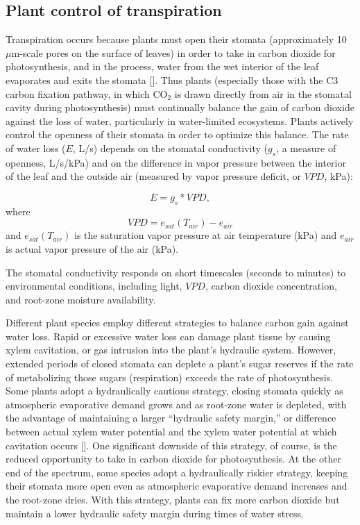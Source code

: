 \subsection{Plant control of transpiration}

Transpiration occurs because plants must open their stomata (approximately 10 $\mu$m-scale pores on the surface of leaves) in order to take in carbon dioxide for photosynthesis, and in the process, water from the wet interior of the leaf evaporates and exits the stomata [\cite{bonan}].  Thus plants (especially those with the C3 carbon fixation pathway, in which CO$_2$ is drawn directly from air in the stomatal cavity during photosynthesis) must continually balance the gain of carbon dioxide against the loss of water, particularly in water-limited ecosystems.  Plants actively control the openness of their stomata in order to optimize this balance.  The rate of water loss ($E$, L/s) depends on the stomatal conductivity ($g_s$, a measure of openness, L/s/kPa) and on the difference in vapor pressure between the interior of the leaf and the outside air (measured by vapor pressure deficit, or $VPD$, kPa):

\begin{equation}
E = g_s * VPD ,
\end{equation}
where
\begin{equation}
VPD = e_{sat}(T_{air}) - e_{air}
\end{equation}
and $e_{sat}(T_{air})$ is the saturation vapor pressure at air temperature (kPa) and $e_{air}$ is actual vapor pressure of the air (kPa).

The stomatal conductivity responds on short timescales (seconds to minutes) to environmental conditions, including light, $VPD$, carbon dioxide concentration, and root-zone moisture availability.

Different plant species employ different strategies to balance carbon gain against water loss.  Rapid or excessive water loss can damage plant tissue by causing xylem cavitation, or gas intrusion into the plant's hydraulic system.  However, extended periods of closed stomata can deplete a plant's sugar reserves if the rate of metabolizing those sugars (respiration) exceeds the rate of photosynthesis.  Some plants adopt a hydraulically cautious strategy, closing stomata quickly as atmospheric evaporative demand grows and as root-zone water is depleted, with the advantage of maintaining a larger ``hydraulic safety margin,'' or difference between actual xylem water potential and the xylem water potential at which cavitation occurs [\cite{choat2012global}]. One significant downside of this strategy, of course, is the reduced opportunity to take in carbon dioxide for photosynthesis.  At the other end of the spectrum, some species adopt a hydraulically riskier strategy, keeping their stomata more open even as atmospheric evaporative demand increases and the root-zone dries.  With this strategy, plants can fix more carbon dioxide but maintain a lower hydraulic safety margin during times of water stress.

